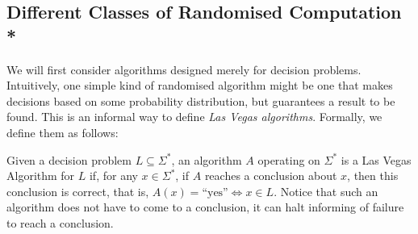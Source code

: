 	\subsection{Different Classes of Randomised Computation *}
	We will first consider algorithms designed merely for decision problems. Intuitively, one 
	simple kind of randomised algorithm might be one that makes decisions based on some 
	probability distribution, but guarantees a result to be found. This is an informal way to 
	define \emph{Las Vegas algorithms}. Formally, we define them as follows:
	\begin{definition}
		Given a decision problem $L \subseteq \Sigma^*$, an algorithm $A$ operating on 
		$\Sigma^*$ is a Las Vegas Algorithm for $L$ if, for any $x \in \Sigma^*$, if
		$A$ reaches a conclusion about $x$, then this conclusion is correct, that is,
		$A(x) = \text{``yes''} \iff x \in L$. Notice that such an algorithm does not have
		to come to a conclusion, it can halt informing of failure to reach a conclusion.
	\end{definition}
	\begin{comment}
		It is important to note that the class of Las Vegas algorithms makes no guarantees
		about the run time given a certain instance of a problem; in fact the run time of 
		a Las Vegas Algorithm $A$ on any $x \in \Sigma^*$ is a random variable $RT_{A, x}$.
	\end{comment}

